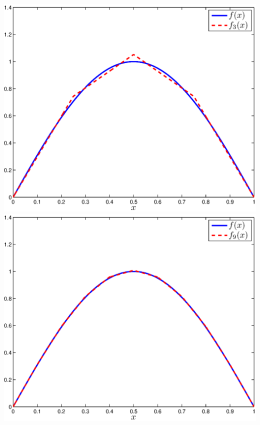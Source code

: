 \begin{solution}
\begin{enumerate}
\begin{center}
   \includegraphics[scale=0.4]{f_3}
   \includegraphics[scale=0.4]{f_9}
\end{center}


\end{enumerate}
\end{solution}